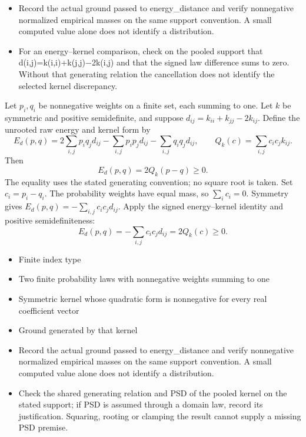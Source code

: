\expandafter\def\csname statadic@diagnostics@STATADIC-ENERGY-001\endcsname{\begin{itemize}
\item Record the actual ground passed to energy\_distance and verify nonnegative normalized empirical masses on the same support convention. A small computed value alone does not identify a distribution.
\item For an energy–kernel comparison, check on the pooled support that d(i,j)=k(i,i)+k(j,j)\ensuremath{-}2k(i,j) and that the signed law difference sums to zero. Without that generating relation the cancellation does not identify the selected kernel discrepancy.
\end{itemize}}
\expandafter\def\csname statadic@statement@STATADIC-ENERGY-002\endcsname{Let $p_i,q_i$ be nonnegative weights on a finite set, each
  summing to one. Let $k$ be symmetric and positive semidefinite, and suppose
  $d_{ij}=k_{ii}+k_{jj}-2k_{ij}$. Define the unrooted raw energy and kernel form by
  \[
    E_d(p,q)=2\sum_{i,j}p_iq_jd_{ij}
      -\sum_{i,j}p_ip_jd_{ij}-\sum_{i,j}q_iq_jd_{ij},
    \qquad Q_k(c)=\sum_{i,j}c_ic_jk_{ij}.
  \]
  Then
  \[
    E_d(p,q)=2Q_k(p-q)\geq 0.
  \]
  The equality uses the stated generating convention; no square root is taken.}
\expandafter\def\csname statadic@proof@STATADIC-ENERGY-002\endcsname{Set $c_i=p_i-q_i$. The probability weights have equal mass,
  so $\sum_i c_i=0$. Symmetry gives $E_d(p,q)=-\sum_{i,j}c_ic_jd_{ij}$.
  Apply the signed energy--kernel identity and positive semidefiniteness:
  \[
    E_d(p,q)=-\sum_{i,j}c_ic_jd_{ij}=2Q_k(c)\geq 0.
  \]}
\expandafter\def\csname statadic@assumptions@STATADIC-ENERGY-002\endcsname{\begin{itemize}
\item Finite index type
\item Two finite probability laws with nonnegative weights summing to one
\item Symmetric kernel whose quadratic form is nonnegative for every real coefficient vector
\item Ground generated by that kernel
\end{itemize}}
\expandafter\def\csname statadic@diagnostics@STATADIC-ENERGY-002\endcsname{\begin{itemize}
\item Record the actual ground passed to energy\_distance and verify nonnegative normalized empirical masses on the same support convention. A small computed value alone does not identify a distribution.
\item Check the shared generating relation and PSD of the pooled kernel on the stated support; if PSD is assumed through a domain law, record its justification. Squaring, rooting or clamping the result cannot supply a missing PSD premise.
\end{itemize}}
